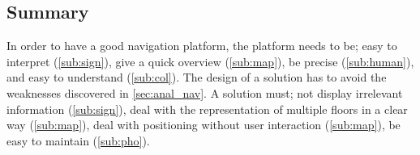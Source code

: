 \subsection{Summary} %
  In order to have a good navigation platform, the platform needs to be; easy to interpret (\cref{sub:sign}), give a quick overview (\cref{sub:map}), be precise (\cref{sub:human}), and easy to understand (\cref{sub:col}). The design of a solution has to avoid the weaknesses discovered in \cref{sec:anal_nav}. A solution must; not display irrelevant information (\cref{sub:sign}), deal with the representation of multiple floors in a clear way (\cref{sub:map}), deal with positioning without user interaction (\cref{sub:map}), be easy to maintain (\cref{sub:pho}).